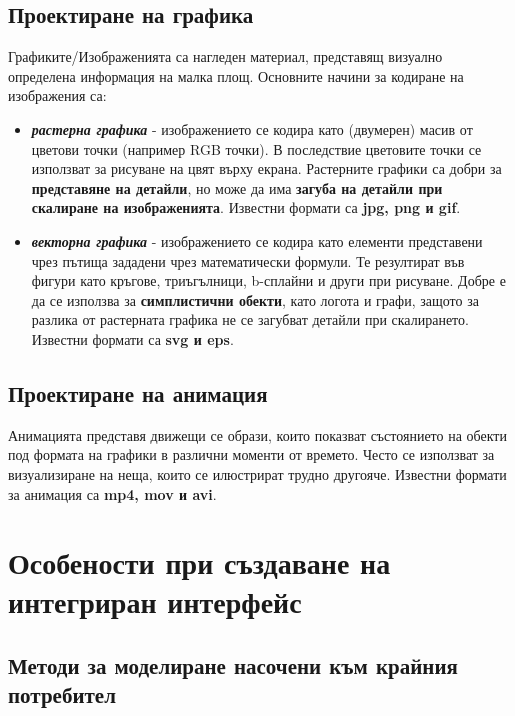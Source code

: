 \documentclass[fleqn,12pt]{article}
\begin{document}
\subsection{Проектиране на графика}

Графиките/Изображенията са нагледен материал, представящ визуално определена информация на малка площ. Основните начини за кодиране на изображения са:
\begin{itemize}
    \item \textbf{\textit{растерна графика}} - изображението се кодира като (двумерен) масив от цветови точки (например RGB точки).
    В последствие цветовите точки се използват за рисуване на цвят върху екрана.
    Растерните графики са добри за \textbf{представяне на детайли}, но може да има \textbf{загуба на детайли при скалиране на изображенията}.
    Известни формати са \textbf{jpg, png и gif}.
    \item \textbf{\textit{векторна графика}} - изображението се кодира като елементи представени чрез пътища зададени чрез математически формули.
    Те резултират във фигури като кръгове, триъгълници, b-сплайни и други при рисуване.
    Добре е да се използва за \textbf{симплистични обекти}, като логота и графи, защото за разлика от растерната графика не се загубват детайли при скалирането.
    Известни формати са \textbf{svg и eps}.
\end{itemize}

\subsection{Проектиране на анимация}

Анимацията представя движещи се образи, които показват състоянието на обекти под формата на графики в различни моменти от времето.
Често се използват за визуализиране на неща, които се илюстрират трудно другояче.
Известни формати за анимация са \textbf{mp4, mov и avi}.

\section{Особености при създаване на интегриран интерфейс}

\subsection{Методи за моделиране насочени  към  крайния  потребител}
\end{document}

